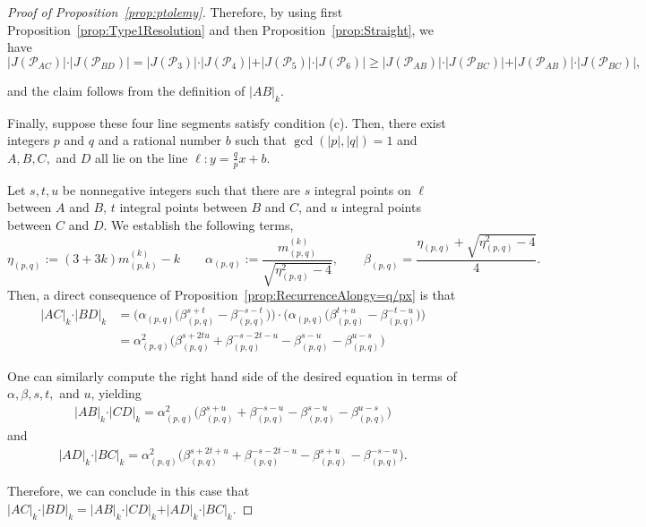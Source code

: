\documentclass{article}
\theoremstyle{remark}
\newcommand{\calP}{\mathcal{P}}
\begin{document}
\begin{proof}[Proof of Proposition~\ref{prop:ptolemy}]
Therefore, by using first Proposition~\ref{prop:Type1Resolution} and then Proposition~\ref{prop:Straight}, we have \[
\vert J(\calP_{AC}) \vert \cdot \vert J(\calP_{BD}) \vert = \vert J(\calP_3) \vert \cdot \vert J(\calP_4) \vert +  \vert J(\calP_5) \vert \cdot \vert J(\calP_6) \vert \geq \vert J(\calP_{AB}) \vert \cdot \vert J(\calP_{BC}) \vert + \vert J(\calP_{AB}) \vert \cdot \vert J(\calP_{BC}) \vert,
\]

and the claim follows from the definition of $\vert AB \vert_k$.


Finally, suppose these four line segments satisfy condition (c). Then, there exist integers $p$ and $q$ and a rational number $b$ such that $\gcd(\vert p \vert,\vert q \vert) = 1$ and $A,B,C,$ and $D$ all lie on the line $\ell:y= \frac{q}{p}x + b$. 

Let $s,t,u$ be nonnegative integers such that there are $s$ integral points on $\ell$ between $A$ and $B$, $t$ integral points between $B$ and $C$, and $u$ integral points between $C$ and $D$. We establish the following terms, \[\eta_{(p,q)} := (3+3k)m_{(p,k)}^{(k)} - k \qquad 
\alpha_{(p,q)}:= \frac{m_{(p,q)}^{(k)}}{\sqrt{\eta_{(p,q)}^2 - 4}}, \qquad \beta_{(p,q)} = \frac{\eta_{(p,q)} + \sqrt{\eta_{(p,q)}^2-4}}{4}.
\]
Then, a direct consequence of Proposition~\ref{prop:RecurrenceAlongy=q/px} is that \begin{align*}
\vert AC \vert_k \cdot \vert BD \vert_k &= \bigg(\alpha_{(p,q)}\big(\beta_{(p,q)}^{s+t} - \beta_{(p,q)}^{-s-t}\big)\bigg)\cdot \bigg(\alpha_{(p,q)}\big(\beta_{(p,q)}^{t+u} - \beta_{(p,q)}^{-t-u}\big)\bigg)\\
&=\alpha_{(p,q)}^2\big(\beta_{(p,q)}^{s+2tu} + \beta_{(p,q)}^{-s-2t-u} - \beta_{(p,q)}^{s-u} - \beta_{(p,q)}^{u-s}\big)
\end{align*}

One can similarly compute the right hand side of the desired equation in terms of $\alpha, \beta, s,t,$ and $u$, yielding
\begin{align*}
\vert AB \vert_k \cdot \vert CD \vert_k = \alpha_{(p,q)}^2\big(\beta_{(p,q)}^{s+u} + \beta_{(p,q)}^{-s-u} - \beta_{(p,q)}^{s-u} - \beta_{(p,q)}^{u-s}\big)
\end{align*}
and 
\begin{align*}
\vert AD \vert_k \cdot \vert BC \vert_k = \alpha_{(p,q)}^2\big(\beta_{(p,q)}^{s+2t + u} + \beta_{(p,q)}^{-s-2t -u} - \beta_{(p,q)}^{s+u} - \beta_{(p,q)}^{-s-u}\big).
\end{align*}

Therefore, we can conclude in this case that $\vert AC \vert_k \cdot \vert BD \vert_k = \vert AB \vert_k \cdot \vert CD \vert_k + \vert AD \vert_k \cdot \vert BC \vert_k$.
\end{proof}
\end{document}
